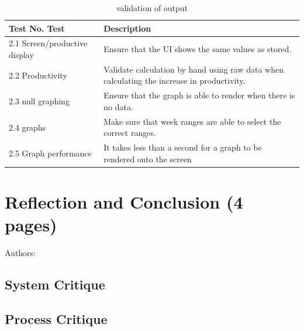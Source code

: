 \documentclass[12pt,a4paper]{article}
\begin{document}
\begin{table}[h]
    \centering
    \renewcommand{\arraystretch}{1.3} %
    \begin{tabular}{|l|p{10cm}|}
        \hline
        \textbf{Test No. Test} & \textbf{Description} \\
        \hline
        2.1 Screen/productive display & Ensure that the UI shows the same values as stored.\\
        \hline
        2.2 Productivity & Validate calculation by hand using raw data when calculating the increase in productivity.\\
        \hline
        2.3 null graphing & Ensure that the graph is able to render when there is no data.\\
        \hline
        2.4 graphs & Make sure that week ranges are able to select the correct ranges.\\
        \hline
        2.5 Graph performance & It takes less than a second for a graph to be rendered onto the screen\\
        \hline
    \end{tabular}
    \caption{validation of output}
    \label{tab:output_tests}
\end{table}

\newpage
\section{Reflection and Conclusion (4 pages)}
Authors:
\label{sec:reflection}
\subsection{System Critique}

\subsection{Process Critique}


\newpage
\end{document}
